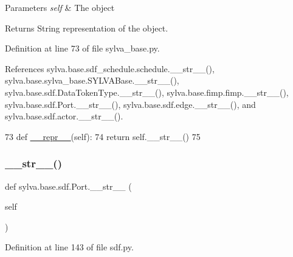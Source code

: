 \begin{DoxyParams}{Parameters}
{\em self} & The object\\
\hline
\end{DoxyParams}
\begin{DoxyReturn}{Returns}
String representation of the object. 
\end{DoxyReturn}


Definition at line 73 of file sylva\+\_\+base.\+py.



References sylva.\+base.\+sdf\+\_\+schedule.\+schedule.\+\_\+\+\_\+str\+\_\+\+\_\+(), sylva.\+base.\+sylva\+\_\+base.\+S\+Y\+L\+V\+A\+Base.\+\_\+\+\_\+str\+\_\+\+\_\+(), sylva.\+base.\+sdf.\+Data\+Token\+Type.\+\_\+\+\_\+str\+\_\+\+\_\+(), sylva.\+base.\+fimp.\+fimp.\+\_\+\+\_\+str\+\_\+\+\_\+(), sylva.\+base.\+sdf.\+Port.\+\_\+\+\_\+str\+\_\+\+\_\+(), sylva.\+base.\+sdf.\+edge.\+\_\+\+\_\+str\+\_\+\+\_\+(), and sylva.\+base.\+sdf.\+actor.\+\_\+\+\_\+str\+\_\+\+\_\+().


\begin{DoxyCode}
73     \textcolor{keyword}{def }\hyperlink{namespacesylva_1_1code__generation_1_1floorplanner_a84f24b1e40f5425e9bb40ab45ccbd10f}{\_\_repr\_\_}(self):
74         \textcolor{keywordflow}{return} self.\_\_str\_\_()
75 
\end{DoxyCode}
\mbox{\label{classsylva_1_1base_1_1sdf_1_1_port_a8e6cd7c07850ca053a8a8788d94ae37c}} 
\subsubsection{\texorpdfstring{\+\_\+\+\_\+str\+\_\+\+\_\+()}{\_\_str\_\_()}}
{\footnotesize\ttfamily def sylva.\+base.\+sdf.\+Port.\+\_\+\+\_\+str\+\_\+\+\_\+ (\begin{DoxyParamCaption}\item[{}]{self }\end{DoxyParamCaption})}







Definition at line 143 of file sdf.\+py.



